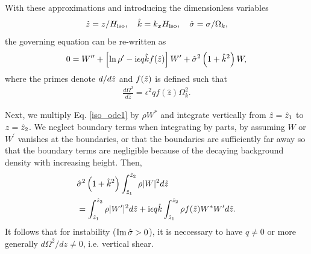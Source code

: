 With these approximations and introducing the dimensionless variables
\begin{align}
  \hat{z} = z/H_\mathrm{iso},\quad \hat{k}=k_xH_\mathrm{iso}, \quad \hat{\sigma} = \sigma/\Omega_k,
\end{align}
the governing equation can be re-written as
\begin{align}
  0 = W^{\prime\prime} + \left[\ln\rho^\prime - \mathrm{i} \epsilon q \hat{k}
    f(\hat{z})\right]W^\prime + \hat{\sigma}^2\left(1+\hat{k}^2\right)W,\label{iso_ode1}
\end{align}
where the primes denote $d/d\hat{z}$ and $f(\hat{z})$ is defined such that
\begin{align}\label{fz_shear}
  \frac{d\Omega^2}{d\hat{z}} = \epsilon^2q f(\hat{z})\Omega_k^2.
\end{align}

Next, we multiply Eq. \ref{iso_ode1} by $\rho W^*$ and integrate 
vertically from $\hat{z}=\hat{z}_1$ to $z=\hat{z}_2$. We neglect boundary
terms when integrating by parts, by assuming $W$ or
$W^\prime$ vanishes at the boundaries, or that the boundaries are 
sufficiently far away so that the boundary terms are negligible because of the
decaying background density with increasing height. Then,
\begin{align}
  &\hat{\sigma}^2\left(1+\hat{k}^2\right)\int_{\hat{z}_1}^{\hat{z}_2}\rho|W|^2d\hat{z} \notag\\
  &=\int_{\hat{z}_1}^{\hat{z}_2}\rho|W^\prime|^2d\hat{z} 
  +\mathrm{i} \epsilon q \hat{k}\int_{\hat{z}_1}^{\hat{z}_2}\rho f(\hat{z}) W^*W^\prime d\hat{z}.\label{integral_relation1}
\end{align}
It follows that for instability ($\operatorname{Im}\hat{\sigma}>0$), it is neccessary to
have $q\neq0$ or more generally $d\Omega^2/dz\neq 0$, i.e. vertical shear.  



